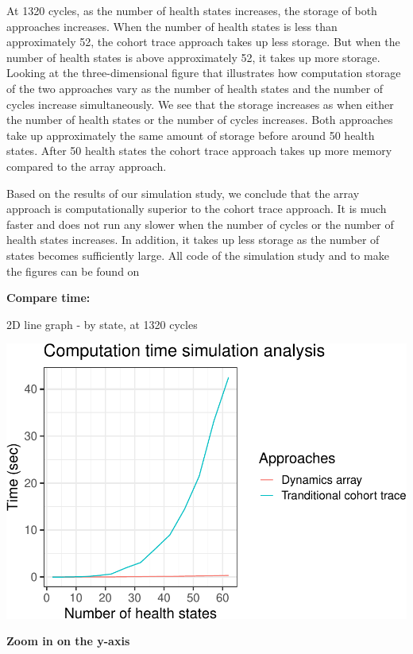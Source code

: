 \documentclass[]{article}
\begin{document}
At 1320 cycles, as the number of health states increases, the storage of
both approaches increases. When the number of health states is less than
approximately 52, the cohort trace approach takes up less storage. But
when the number of health states is above approximately 52, it takes up
more storage. Looking at the three-dimensional figure that illustrates
how computation storage of the two approaches vary as the number of
health states and the number of cycles increase simultaneously. We see
that the storage increases as when either the number of health states or
the number of cycles increases. Both approaches take up approximately
the same amount of storage before around 50 health states. After 50
health states the cohort trace approach takes up more memory compared to
the array approach.

Based on the results of our simulation study, we conclude that the array
approach is computationally superior to the cohort trace approach. It is
much faster and does not run any slower when the number of cycles or the
number of health states increases. In addition, it takes up less storage
as the number of states becomes sufficiently large. All code of the
simulation study and to make the figures can be found on

\textbf{Compare time:}

2D line graph - by state, at 1320 cycles

\includegraphics{compare_time_memory_files/figure-latex/unnamed-chunk-1-1.pdf}

\textbf{Zoom in on the y-axis}
\end{document}
